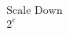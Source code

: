 \documentclass[preview]{standalone}
\begin{document}
\begin{align*}
\text{Scale Down} \\ 2^e
\end{align*}
\end{document}
